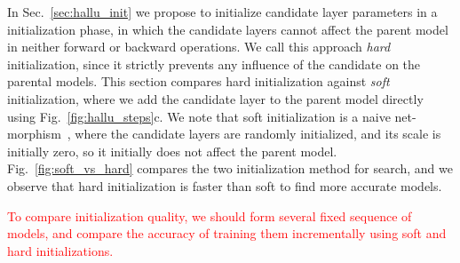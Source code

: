\documentclass{article}
\newcommand{\todo}[1]{\textcolor{red}{#1}}
\begin{document}
In Sec.~\ref{sec:hallu_init} we propose to initialize candidate layer parameters in a initialization phase, in which the candidate layers cannot affect the parent model in neither forward or backward operations. We call this approach \emph{hard} initialization, since it strictly prevents any influence of the candidate on the parental models. This section compares hard initialization against \emph{soft} initialization, where we add the candidate layer to the parent model directly using Fig.~\ref{fig:hallu_steps}c. We note that soft initialization is a naive net-morphism~\citep{netmorph}, where the candidate layers are randomly initialized, and its scale is initially zero, so it initially does not affect the parent model. 
Fig.~\ref{fig:soft_vs_hard} compares the two initialization method for search, and we observe that hard initialization is faster than soft to find more accurate models.

\todo{To compare initialization quality, we should form several fixed sequence of models, and compare the accuracy of training them incrementally using soft and hard initializations.}
\end{document}
